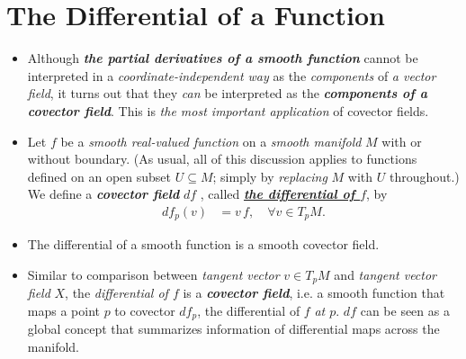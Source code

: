 \documentclass[11pt]{article}
\begin{document}
\section{The Differential of a Function}
\begin{itemize}

\item \begin{remark}
Although \emph{\textbf{the partial derivatives of a smooth function}} cannot be interpreted in a \emph{coordinate-independent way} as the \emph{components} of \emph{a vector field}, it turns out that they \emph{can} be interpreted as the \emph{\textbf{components of a covector field}}. This is \emph{the most important application} of covector fields.
\end{remark}

\item  \begin{definition}
Let $f$ be a \emph{smooth real-valued function} on a \emph{smooth manifold} $M$ with or without boundary. (As usual, all of this discussion applies to functions defined on an open subset $U \subseteq M$; simply by \emph{replacing} $M$ with $U$ throughout.) We define a \emph{\textbf{covector field}} $df$ , called \underline{\emph{\textbf{the differential of $f$}}}, by
\begin{align*}
df_{p}(v) &= v\,f, \quad \forall v\in T_{p}M.
\end{align*}
\end{definition}

\item \begin{proposition}
The differential of a smooth function is a smooth covector field.
\end{proposition}

\item \begin{remark}
Similar to comparison between \emph{tangent vector} $v \in T_{p}M$ and \emph{tangent vector field} $X$, the \emph{differential of $f$} is a \emph{\textbf{covector field}}, i.e. a smooth function that maps a point $p$ to covector $df_{p}$, the differential of $f$ \emph{at $p$}. $df$ can be seen as a global concept that summarizes information of differential maps across the manifold. 
\end{remark}


\end{itemize}
\end{document}
